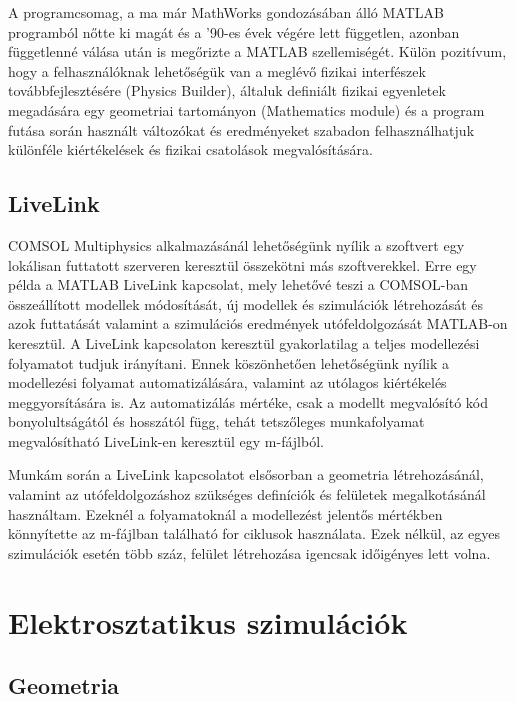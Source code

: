 A programcsomag, a ma már MathWorks gondozásában álló MATLAB programból nőtte ki magát és a '90-es évek végére lett független\cite{history}, azonban függetlenné válása után is megőrizte a MATLAB szellemiségét. Külön pozitívum, hogy a felhasználóknak lehetőségük van a meglévő fizikai interfészek továbbfejlesztésére (Physics Builder), általuk definiált fizikai egyenletek megadására egy geometriai tartományon (Mathematics module) és a program futása során használt változókat és eredményeket szabadon felhasználhatjuk különféle kiértékelések és fizikai csatolások megvalósítására.

\subsection{LiveLink}

COMSOL Multiphysics alkalmazásánál lehetőségünk nyílik a szoftvert egy lokálisan futtatott szerveren keresztül összekötni más szoftverekkel. Erre egy példa a MATLAB LiveLink\cite{livelink} kapcsolat, mely lehetővé teszi a COMSOL-ban összeállított modellek módosítását, új modellek és szimulációk létrehozását és azok futtatását valamint a szimulációs eredmények utófeldolgozását MATLAB-on keresztül. A LiveLink kapcsolaton keresztül gyakorlatilag a teljes modellezési folyamatot tudjuk irányítani. Ennek köszönhetően lehetőségünk nyílik a modellezési folyamat automatizálására, valamint az utólagos kiértékelés meggyorsítására is. Az automatizálás mértéke, csak a modellt megvalósító kód bonyolultságától és hosszától függ, tehát tetszőleges munkafolyamat megvalósítható LiveLink-en keresztül egy m-fájlból.

Munkám során a LiveLink kapcsolatot elsősorban a geometria létrehozásánál, valamint az utófeldolgozáshoz szükséges definíciók és felületek megalkotásánál használtam. Ezeknél a folyamatoknál a modellezést jelentős mértékben könnyítette az m-fájlban található for ciklusok használata. Ezek nélkül, az egyes szimulációk esetén több száz, felület létrehozása igencsak időigényes lett volna.

\section{Elektrosztatikus szimulációk}
\subsection{Geometria}
\label{sec:El_geometry}

